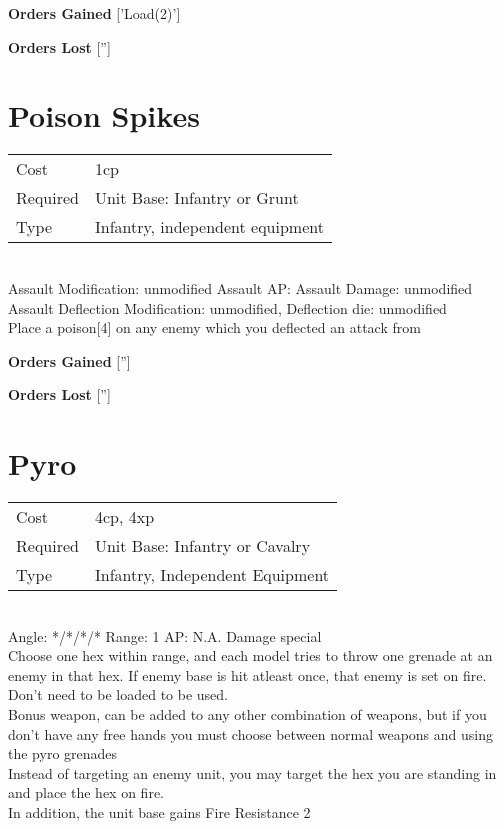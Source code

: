 {\bf Orders Gained}
['Load(2)']

{\bf Orders Lost}
['']


\section{ Poison Spikes }

\begin{tabular}{ll}
    Cost & 1cp \\
    Required & Unit Base: Infantry or Grunt\\
    Type & Infantry, independent equipment\\
\end{tabular}
\ \\
Assault Modification: unmodified Assault AP:  Assault Damage: unmodified\\
Assault Deflection Modification: unmodified, Deflection die: unmodified \\


Place a poison[4] on any enemy which you deflected an attack from

{\bf Orders Gained}
['']

{\bf Orders Lost}
['']
\section{ Pyro }

\begin{tabular}{ll}
    Cost & 4cp, 4xp \\
    Required & Unit Base: Infantry or Cavalry\\
    Type & Infantry, Independent Equipment\\
\end{tabular}
\ \\
\indent Angle: */*/*/* Range: 1  AP: N.A. Damage special \\
Choose one hex within range, and each model tries to throw one grenade at an enemy in that hex. If enemy base is hit atleast once, that enemy is set on fire. \\ Don't need to be loaded to be used.\\ Bonus weapon, can be added to any other combination of weapons, but if you don't have any free hands you must choose between normal weapons and using the pyro grenades\\ Instead of targeting an enemy unit, you may target the hex you are standing in and place the hex on fire.\\ In addition, the unit base gains Fire Resistance 2
\ \\

